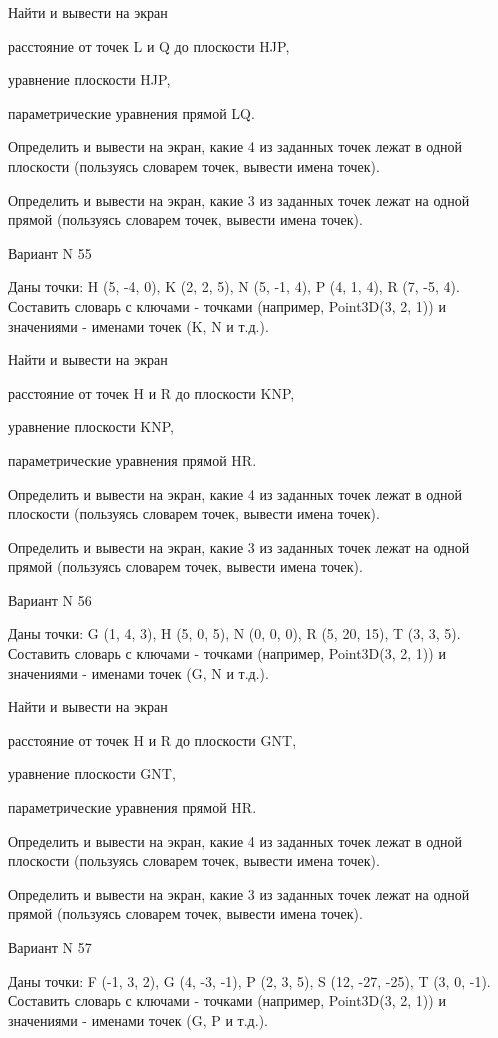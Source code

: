 \documentclass[11pt]{report}
\begin{document}
Найти и вывести на экран


расстояние от точек L и Q до плоскости HJP,


уравнение плоскости HJP,


параметрические уравнения прямой LQ.


Определить и вывести на экран, какие 4 из заданных точек лежат в одной плоскости (пользуясь словарем точек, вывести имена точек).


Определить и вывести на экран, какие 3 из заданных точек лежат на одной прямой (пользуясь словарем точек, вывести имена точек).

\newpage
Вариант N 55

Даны точки: H (5, -4, 0), K (2, 2, 5), N (5, -1, 4), P (4, 1, 4), R (7, -5, 4).
Составить словарь с ключами - точками (например, Point3D(3, 2, 1)) и значениями - именами точек (K, N и т.д.).


Найти и вывести на экран


расстояние от точек H и R до плоскости KNP,


уравнение плоскости KNP,


параметрические уравнения прямой HR.


Определить и вывести на экран, какие 4 из заданных точек лежат в одной плоскости (пользуясь словарем точек, вывести имена точек).


Определить и вывести на экран, какие 3 из заданных точек лежат на одной прямой (пользуясь словарем точек, вывести имена точек).

\newpage
Вариант N 56

Даны точки: G (1, 4, 3), H (5, 0, 5), N (0, 0, 0), R (5, 20, 15), T (3, 3, 5).
Составить словарь с ключами - точками (например, Point3D(3, 2, 1)) и значениями - именами точек (G, N и т.д.).


Найти и вывести на экран


расстояние от точек H и R до плоскости GNT,


уравнение плоскости GNT,


параметрические уравнения прямой HR.


Определить и вывести на экран, какие 4 из заданных точек лежат в одной плоскости (пользуясь словарем точек, вывести имена точек).


Определить и вывести на экран, какие 3 из заданных точек лежат на одной прямой (пользуясь словарем точек, вывести имена точек).

\newpage
Вариант N 57

Даны точки: F (-1, 3, 2), G (4, -3, -1), P (2, 3, 5), S (12, -27, -25), T (3, 0, -1).
Составить словарь с ключами - точками (например, Point3D(3, 2, 1)) и значениями - именами точек (G, P и т.д.).
\end{document}
